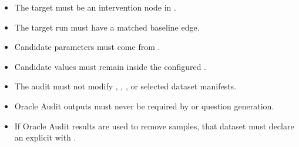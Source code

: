 \documentclass[11pt]{article}
\begin{document}
\begin{itemize}
\item The target  must be an intervention node in .
\item The target run must have a matched baseline edge.
\item Candidate parameters must come from .
\item Candidate values must remain inside the configured .
\item The audit must not modify , , , or selected dataset manifests.
\item Oracle Audit outputs must never be required by  or question generation.
\item If Oracle Audit results are used to remove samples, that dataset must declare an explicit  with .
\end{itemize}
\end{document}
